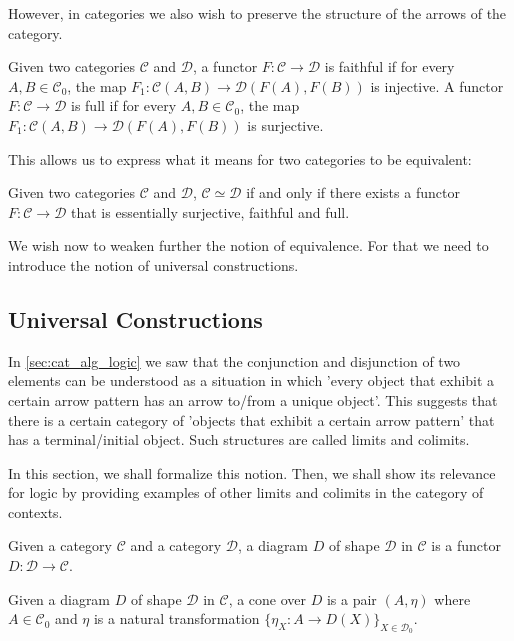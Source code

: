 However, in categories we also wish to preserve the structure of 
the arrows of the category.
\begin{definition}
    Given two categories $\mathcal{C}$ and $\mathcal{D}$,
    a functor $F:\mathcal{C}\to\mathcal{D}$ is faithful if for every $A,B\in\mathcal{C}_0$,
    the map $F_1:\mathcal{C}(A,B)\to\mathcal{D}(F(A),F(B))$ is injective.
    A functor $F:\mathcal{C}\to\mathcal{D}$ is full if for every $A,B\in\mathcal{C}_0$,
    the map $F_1:\mathcal{C}(A,B)\to\mathcal{D}(F(A),F(B))$ is surjective.
\end{definition}

This allows us to express what it means for two categories to be equivalent:
\begin{lemma}
    Given two categories $\mathcal{C}$ and $\mathcal{D}$,
    $\mathcal{C}\simeq\mathcal{D}$ if and only if there exists a functor 
    $F:\mathcal{C}\to\mathcal{D}$
    that is essentially surjective, faithful and full.
\end{lemma}

We wish now to weaken further the notion of equivalence.
For that we need to introduce the notion of universal constructions.

\subsection{Universal Constructions}
In \ref{sec:cat_alg_logic} we saw that the conjunction and 
disjunction of two elements
can be understood as a situation in which 'every object that exhibit a
certain arrow pattern has an arrow to/from a unique object'.
This suggests that there is a certain category of
'objects that exhibit a certain arrow pattern' 
that has a terminal/initial object. Such structures are called limits and colimits.

In this section, we shall formalize this notion.
Then, we shall show its relevance for logic by providing examples of other limits and colimits
in the category of contexts.

\begin{definition}[Diagram]
    Given a category $\mathcal{C}$ and a category
    $\mathcal{D}$, a diagram $D$ of 
    shape $\mathcal{D}$ in $\mathcal{C}$
    is a functor $D:\mathcal{D}\to\mathcal{C}$.
\end{definition}

\begin{definition}[Cone]
    Given a diagram $D$ of shape $\mathcal{D}$ in $\mathcal{C}$,
    a cone over $D$ is a pair $(A,\eta)$ where $A\in\mathcal{C}_0$
    and $\eta$ is a 
    natural transformation $\{\eta_X:A\to D(X)\}_{X\in\mathcal{D}_0}$.
\end{definition}

